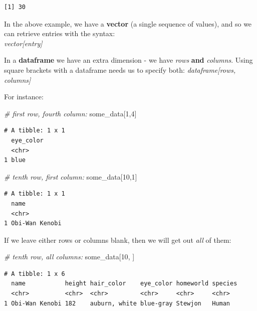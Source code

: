 \documentclass[]{book}
\newenvironment{Shaded}{\begin{snugshade}}{\end{snugshade}}
\newcommand{\CommentTok}[1]{\textcolor[rgb]{0.56,0.35,0.01}{\textit{#1}}}
\newcommand{\DecValTok}[1]{\textcolor[rgb]{0.00,0.00,0.81}{#1}}
\newcommand{\NormalTok}[1]{#1}
\begin{document}
\begin{verbatim}
[1] 30
\end{verbatim}

In the above example, we have a \textbf{vector} (a single sequence of values), and so we can retrieve entries with the syntax:\\
\emph{vector{[}entry{]}}

In a \textbf{dataframe} we have an extra dimension - we have \emph{rows} \textbf{and} \emph{columns}.
Using square brackets with a dataframe needs us to specify both:
\emph{dataframe{[}rows, columns{]}}

For instance:

\begin{Shaded}
\begin{Highlighting}[]
\CommentTok{# first row, fourth column:}
\NormalTok{some_data[}\DecValTok{1}\NormalTok{,}\DecValTok{4}\NormalTok{]}
\end{Highlighting}
\end{Shaded}

\begin{verbatim}
# A tibble: 1 x 1
  eye_color
  <chr>    
1 blue     
\end{verbatim}

\begin{Shaded}
\begin{Highlighting}[]
\CommentTok{# tenth row, first column:}
\NormalTok{some_data[}\DecValTok{10}\NormalTok{,}\DecValTok{1}\NormalTok{]}
\end{Highlighting}
\end{Shaded}

\begin{verbatim}
# A tibble: 1 x 1
  name          
  <chr>         
1 Obi-Wan Kenobi
\end{verbatim}

If we leave either rows or columns blank, then we will get out \emph{all} of them:

\begin{Shaded}
\begin{Highlighting}[]
\CommentTok{# tenth row, all columns:}
\NormalTok{some_data[}\DecValTok{10}\NormalTok{, ]}
\end{Highlighting}
\end{Shaded}

\begin{verbatim}
# A tibble: 1 x 6
  name           height hair_color    eye_color homeworld species
  <chr>          <chr>  <chr>         <chr>     <chr>     <chr>  
1 Obi-Wan Kenobi 182    auburn, white blue-gray Stewjon   Human  
\end{verbatim}
\end{document}
